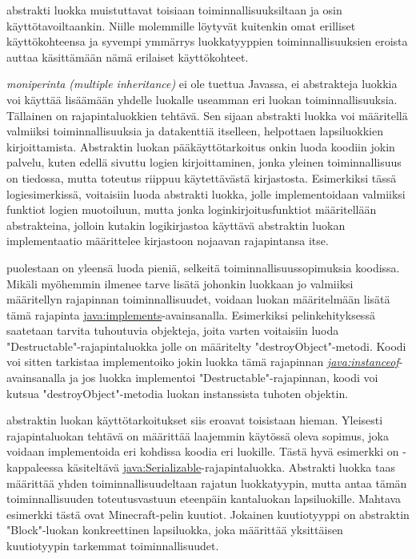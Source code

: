\documentclass[a4paper,justified,notoc]{tufte-book}
\newcommand{\eng}[1]{\textit{(#1)}}
\newcommand{\new}[1]{\textit{\gls{#1}}}
\newcommand{\neweng}[2]{\new{#1} \eng{#2}}
\newcommand{\java}[1]{\underline{\gls{java:#1}}}
\newcommand{\newjava}[1]{\textit{\java{#1}}}
\begin{document}
\begin{fullwidth}
 abstrakti luokka muistuttavat toisiaan toiminnallisuuksiltaan ja
osin käyttötavoiltaankin. Niille molemmille löytyvät kuitenkin omat erilliset käyttökohteensa ja
syvempi ymmärrys luokkatyyppien toiminnallisuuksien eroista auttaa käsittämään nämä erilaiset
käyttökohteet.

 \neweng{moniperinta}{multiple inheritance} ei ole tuettua Javassa, ei
abstrakteja luokkia voi käyttää lisäämään yhdelle luokalle useamman eri luokan toiminnallisuuksia.
Tällainen on rajapintaluokkien tehtävä. Sen sijaan abstrakti luokka voi määritellä valmiiksi
toiminnallisuuksia ja datakenttiä itselleen, helpottaen lapsiluokkien kirjoittamista. Abstraktin
luokan pääkäyttötarkoitus onkin luoda koodiin jokin palvelu, kuten edellä sivuttu logien	
kirjoittaminen, jonka yleinen toiminnallisuus on tiedossa, mutta toteutus riippuu käytettävästä
kirjastosta. Esimerkiksi tässä logiesimerkissä, voitaisiin luoda abstrakti luokka, jolle
implementoidaan valmiiksi funktiot logien muotoiluun, mutta jonka loginkirjoitusfunktiot
määritellään abstrakteina, jolloin kutakin logikirjastoa käyttävä abstraktin luokan implementaatio
määrittelee kirjastoon nojaavan rajapintansa itse.

 puolestaan on yleensä luoda pieniä, selkeitä
toiminnallisuussopimuksia koodissa. Mikäli myöhemmin ilmenee tarve lisätä johonkin luokkaan jo
valmiiksi määritellyn rajapinnan toiminnallisuudet, voidaan luokan määritelmään lisätä tämä
rajapinta \java{implements}-avainsanalla. Esimerkiksi pelinkehityksessä saatetaan tarvita
tuhoutuvia objekteja, joita varten voitaisiin luoda "Destructable"-rajapintaluokka jolle on
määritelty "destroyObject"-metodi. Koodi voi sitten tarkistaa implementoiko jokin luokka tämä
rajapinnan \newjava{instanceof}-avainsanalla ja jos luokka implementoi "Destructable"-rajapinnan,
koodi voi kutsua "destroyObject"-metodia luokan instanssista tuhoten objektin.

 abstraktin luokan käyttötarkoitukset siis eroavat toisistaan
hieman. Yleisesti rajapintaluokan tehtävä on määrittää laajemmin käytössä oleva sopimus, joka
voidaan implementoida eri kohdissa koodia eri luokille. Tästä hyvä esimerkki on
-kappaleessa käsiteltävä \java{Serializable}-rajapintaluokka. Abstrakti
luokka taas määrittää yhden toiminnallisuudeltaan rajatun luokkatyypin, mutta antaa tämän
toiminnallisuuden toteutusvastuun eteenpäin kantaluokan lapsiluokille. Mahtava esimerkki tästä
ovat Minecraft-pelin kuutiot. Jokainen kuutiotyyppi on abstraktin "Block"-luokan konkreettinen
lapsiluokka, joka määrittää yksittäisen kuutiotyypin tarkemmat toiminnallisuudet.


\end{fullwidth}
\end{document}
